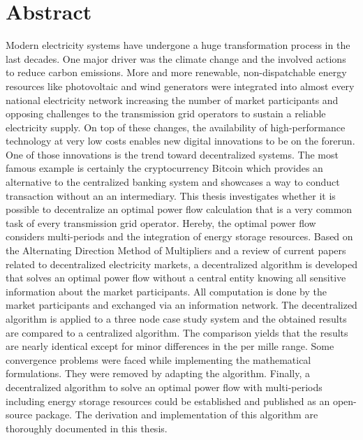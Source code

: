 \section*{Abstract}

Modern electricity systems have undergone a huge transformation process in the last decades. One major driver was the climate change and the involved actions to reduce carbon emissions. More and more renewable, non-dispatchable energy resources like photovoltaic and wind generators were integrated into almost every national electricity network increasing the number of market participants and opposing challenges to the transmission grid operators to sustain a reliable electricity supply. On top of these changes, the availability of high-performance technology at very low costs enables new digital innovations to be on the forerun. One of those innovations is the trend toward decentralized systems. The most famous example is certainly the cryptocurrency Bitcoin which provides an alternative to the centralized banking system and showcases a way to conduct transaction without an an intermediary. This thesis investigates whether it is possible to decentralize an optimal power flow calculation that is a very common task of every transmission grid operator. Hereby, the optimal power flow considers multi-periods and the integration of energy storage resources. Based on the Alternating Direction Method of Multipliers and a review of current papers related to decentralized electricity markets, a decentralized algorithm is developed that solves an optimal power flow without a central entity knowing all sensitive information about the market participants. All computation is done by the market participants and exchanged via an information network. The decentralized algorithm is applied to a three node case study system and the obtained results are compared to a centralized algorithm. The comparison yields that the results are nearly identical except for minor differences in the per mille range. Some convergence problems were faced while implementing the mathematical formulations. They were removed by adapting the algorithm. Finally, a decentralized algorithm to solve an optimal power flow with multi-periods including energy storage resources could be established and published as an open-source package. The derivation and implementation of this algorithm are thoroughly documented in this thesis.